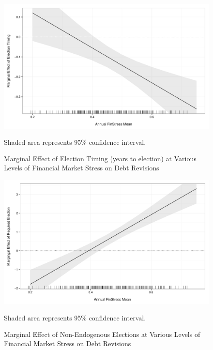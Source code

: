 \documentclass[]{article}
\begin{document}
\begin{figure}
    \caption{Marginal Effect of Election Timing (years to election) at Various Levels of Financial Market Stress on Debt Revisions}
    \label{me_finstress_elect}

    \begin{center}
        \includegraphics[scale=0.4]{figures/finstress_elect_me.pdf}
    \end{center}

	{\scriptsize{Shaded area represents 95\% confidence interval.}}

\end{figure}

\begin{figure}
    \caption{Marginal Effect of Non-Endogenous Elections at Various Levels of Financial Market Stress on Debt Revisions}
    \label{me_finstress_required_elect}

    \begin{center}
        \includegraphics[scale=0.4]{figures/finstress_required_elect_me.pdf}
    \end{center}

	{\scriptsize{Shaded area represents 95\% confidence interval.}}

\end{figure}
\end{document}
